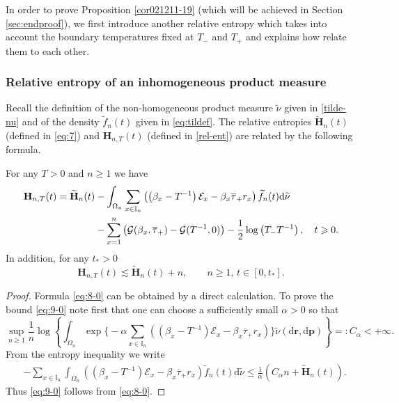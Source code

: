 \documentclass[EJP]{ejpecp} %
\newcommand\al{\alpha}
\newcommand\T{{\mathbb I}}
\newcommand\Om{\Omega}
\renewcommand{\ge}{\geqslant}
\renewcommand{\le}{\leqslant}
\newcommand{\dd  }{\mathrm{d}}
\renewcommand{\tilde}{\widetilde}
\renewcommand{\bar}{\overline}
\numberwithin{equation}{section}
\begin{document}
In order to prove Proposition  \ref{cor021211-19} (which will be
achieved in Section \ref{sec:endproof}), we first introduce another
relative entropy which takes into account the boundary temperatures
fixed at $T_-$ and $T_+$ and explains how relate them to each other.  

\subsubsection{Relative entropy of an inhomogeneous product measure}

Recall the definition of the non-homogeneous product measure $\tilde\nu$ given in \eqref{tilde-nu} and of the density $\tilde f_n(t)$ given in \eqref{eq:tildef}. 
The relative entropies $ \tilde{\mathbf{H}}_n(t)$ (defined in \eqref{eq:7}) and $\mathbf{H}_{n,T}(t)$ (defined in \eqref{rel-ent}) are related by the following formula.
\begin{proposition}
\label{prop-rel-ent}
For any $T>0$ and $n\ge1$ we have 
\begin{align}
  \mathbf{H}_{n,T}(t) = \tilde{\mathbf{H}}_n(t) & - \int_{\Om_n}  \sum_{x\in\T_n} \left(\left(\beta_x - T^{-1}\right) \mathcal E_x
    - \beta_x\bar\tau_+ r_x\right) \tilde f_n(t)  \dd \tilde{ \nu} \notag\\ 
   & - \sum_{x=1}^n \left(\mathcal G(\beta_x,\bar\tau_+) - \mathcal
      G(T^{-1},0)\right) -\frac12 \log \left(T_- T^{-1}\right),\quad t\ge0.\label{eq:8-0} 
 \end{align}
In addition, for any $t_*>0$
\begin{equation}
  \label{eq:9-0}
 \mathbf{H}_{n,T}(t) \lesssim \tilde{\mathbf{H}}_n(t) +  n,\qquad n\ge1,\,t\in[0,t_*].
\end{equation}
\end{proposition}
\begin{proof}
Formula \eqref{eq:8-0} can be obtained by a direct calculation.
To prove the bound \eqref{eq:9-0} note first that
one can choose a sufficiently small $\al>0$  so that
\begin{equation}
\label{030611-19}
\sup_{n\ge1}\frac1n\log\left\{\int_{\Om_n}
     \exp\Big\{-\al \sum_{x\in\T_n} \left(\left(\beta_x - T^{-1}\right) \mathcal E_x
    - \beta_x\bar\tau_+ r_x\right) 
  \Big\}\tilde{\nu} (\dd\mathbf r, \dd\mathbf p)\right\}=:C_\al<+\infty.
\end{equation}
From the entropy inequality  we write 
\begin{align*}
&-\sum_{x\in\T_n}\int_{\Om_n}  \left(\left(\beta_x - T^{-1}\right) \mathcal E_x
    - \beta_x\bar\tau_+ r_x\right) \tilde f_n(t) \dd \tilde{\nu}
\le \frac{1}{\al}\left( C_\al n+\tilde{\mathbf{H}}_n(t)\right).
\end{align*}
Thus \eqref{eq:9-0}
follows from \eqref{eq:8-0}.\end{proof}
\end{document}
